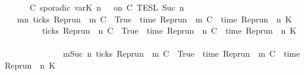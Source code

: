 \begin{isabellebody}
\ \ \ \ {\isasymunion}\ {\isasymlbrakk}\ C\ sporadic{\isasymsharp}\ {\isasymlparr}{\isasymtau}\isactrlsub v\isactrlsub a\isactrlsub r{\isacharparenleft}K{\isacharcomma}\ n{\isacharprime}{\isacharparenright}\ {\isasymoplus}\ {\isasymtau}{\isasymrparr}\ on\ C\ {\isasymrbrakk}\isactrlsub T\isactrlsub E\isactrlsub S\isactrlsub L\isactrlbsup {\isasymge}\ Suc\ n\isactrlesup {\isacartoucheclose}\isanewline
%
\isadelimproof
%
\endisadelimproof
%
\isatagproof
{}\isamarkupfalse%
\ {\isacharminus}\isanewline
\ \ \isamarkupfalse%
\ {\isacartoucheopen}{\isacharbraceleft}\ {\isasymrho}{\isachardot}\ {\isasymexists}m{\isasymge}n{\isachardot}\ ticks\ {\isacharparenleft}{\isacharparenleft}Rep{\isacharunderscore}run\ {\isasymrho}{\isacharparenright}\ m\ C\ {\isacharequal}\ True\ {\isasymand}\ time\ {\isacharparenleft}{\isacharparenleft}Rep{\isacharunderscore}run\ {\isasymrho}{\isacharparenright}\ m\ C\ {\isacharequal}\ time\ {\isacharparenleft}{\isacharparenleft}Rep{\isacharunderscore}run\ {\isasymrho}{\isacharparenright}\ n{\isacharprime}\ K{\isacharparenright}\ {\isacharplus}\ {\isasymtau}\ {\isacharbraceright}\isanewline
\ \ \ \ \ \ {\isacharequal}\ {\isacharbraceleft}\ {\isasymrho}{\isachardot}\ ticks\ {\isacharparenleft}{\isacharparenleft}Rep{\isacharunderscore}run\ {\isasymrho}{\isacharparenright}\ n\ C\ {\isacharequal}\ True\ {\isasymand}\ time\ {\isacharparenleft}{\isacharparenleft}Rep{\isacharunderscore}run\ {\isasymrho}{\isacharparenright}\ n\ C\ {\isacharequal}\ time\ {\isacharparenleft}{\isacharparenleft}Rep{\isacharunderscore}run\ {\isasymrho}{\isacharparenright}\ n{\isacharprime}\ K{\isacharparenright}\ {\isacharplus}\ {\isasymtau}\isanewline
\ \ \ \ \ \ \ \ \ \ \ \ \ {\isasymor}\ {\isacharparenleft}{\isasymexists}m{\isasymge}Suc\ n{\isachardot}\ ticks\ {\isacharparenleft}{\isacharparenleft}Rep{\isacharunderscore}run\ {\isasymrho}{\isacharparenright}\ m\ C\ {\isacharequal}\ True\ {\isasymand}\ time\ {\isacharparenleft}{\isacharparenleft}Rep{\isacharunderscore}run\ {\isasymrho}{\isacharparenright}\ m\ C\ {\isacharequal}\ time\ {\isacharparenleft}{\isacharparenleft}Rep{\isacharunderscore}run\ {\isasymrho}{\isacharparenright}\ n{\isacharprime}\ K{\isacharparenright}\ {\isacharplus}\ {\isasymtau}{\isacharparenright}\ {\isacharbraceright}{\isacartoucheclose}\isanewline

\end{isabellebody}
